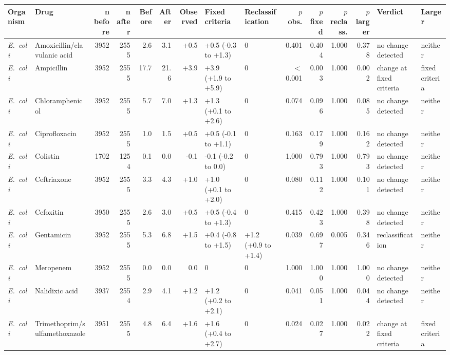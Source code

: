 \begin{table}[h]
\centering
\scriptsize
\begin{tabular}{llrrrrrllrrrrll}
\toprule
Organism & Drug & n before & n after & Before & After & Observed & Fixed criteria & Reclassification & $p$ obs. & $p$ fixed & $p$ reclass. & $p$ larger & Verdict & Larger \\
\midrule
\textit{E.~coli} & Amoxicillin/clavulanic acid & 3952 & 2555 & 2.6 & 3.1 & +0.5 & +0.5 (-0.3 to +1.3) & 0 & 0.401 & 0.404 & 1.000 & 0.378 & no change detected & neither \\
\textit{E.~coli} & Ampicillin & 3952 & 2555 & 17.7 & 21.6 & +3.9 & +3.9 (+1.9 to +5.9) & 0 & $<$0.001 & 0.003 & 1.000 & 0.002 & change at fixed criteria & fixed criteria \\
\textit{E.~coli} & Chloramphenicol & 3952 & 2555 & 5.7 & 7.0 & +1.3 & +1.3 (+0.1 to +2.6) & 0 & 0.074 & 0.096 & 1.000 & 0.085 & no change detected & neither \\
\textit{E.~coli} & Ciprofloxacin & 3952 & 2555 & 1.0 & 1.5 & +0.5 & +0.5 (-0.1 to +1.1) & 0 & 0.163 & 0.179 & 1.000 & 0.162 & no change detected & neither \\
\textit{E.~coli} & Colistin & 1702 & 1254 & 0.1 & 0.0 & -0.1 & -0.1 (-0.2 to 0.0) & 0 & 1.000 & 0.793 & 1.000 & 0.793 & no change detected & neither \\
\textit{E.~coli} & Ceftriaxone & 3952 & 2555 & 3.3 & 4.3 & +1.0 & +1.0 (+0.1 to +2.0) & 0 & 0.080 & 0.112 & 1.000 & 0.101 & no change detected & neither \\
\textit{E.~coli} & Cefoxitin & 3950 & 2555 & 2.6 & 3.0 & +0.5 & +0.5 (-0.4 to +1.3) & 0 & 0.415 & 0.423 & 1.000 & 0.398 & no change detected & neither \\
\textit{E.~coli} & Gentamicin & 3952 & 2555 & 5.3 & 6.8 & +1.5 & +0.4 (-0.8 to +1.5) & +1.2 (+0.9 to +1.4) & 0.039 & 0.697 & 0.005 & 0.346 & reclassification & neither \\
\textit{E.~coli} & Meropenem & 3952 & 2555 & 0.0 & 0.0 & 0.0 & 0 & 0 & 1.000 & 1.000 & 1.000 & 1.000 & no change detected & neither \\
\textit{E.~coli} & Nalidixic acid & 3937 & 2554 & 2.9 & 4.1 & +1.2 & +1.2 (+0.2 to +2.1) & 0 & 0.041 & 0.051 & 1.000 & 0.044 & no change detected & neither \\
\textit{E.~coli} & Trimethoprim/sulfamethoxazole & 3951 & 2555 & 4.8 & 6.4 & +1.6 & +1.6 (+0.4 to +2.7) & 0 & 0.024 & 0.027 & 1.000 & 0.022 & change at fixed criteria & fixed criteria \\

\end{tabular}
\end{table}

